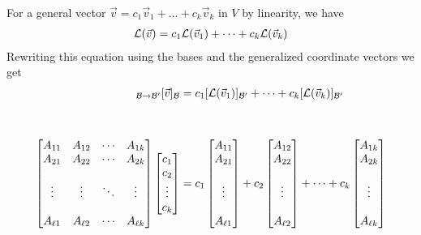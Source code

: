 For a general vector $\vec{v} = c_1 \vec{v}_1 + \dots + c_k \vec{v}_k$ in $V$ by linearity, we have\\
\begin{align*}
  \mathcal{L} (\vec{v}) = c_1 \mathcal{L} (\vec{v}_1) + \dots + c_k \mathcal{L} (\vec{v}_k)\\
\end{align*}
Rewriting this equation using the bases and the generalized coordinate vectors we get\\
\begin{align*}
  [\call]_{\calb \rightarrow \calb'} [\vec{v}]_{\calb}
  &= c_1 [\call (\vec{v}_1)]_{\calb'} + \dots + c_k [\call (\vec{v}_k)]_{\calb'} \\\\\\
  \begin{bmatrix}
    A_{11} & A_{12} & \cdots & A_{1k} \\
    A_{21} & A_{22} & \cdots & A_{2k} \\\\
    \vdots & \vdots & \ddots & \vdots \\\\
    A_{\ell 1} & A_{\ell 2} & \cdots & A_{\ell k}
  \end{bmatrix}
  \begin{bmatrix} c_1 \\ c_2 \\ \vdots \\ c_k \end{bmatrix}
    &=
    c_1 \begin{bmatrix}
      A_{11} \\
      A_{21} \\\\
      \vdots \\\\
      A_{\ell 1}
    \end{bmatrix}
    + c_2 \begin{bmatrix}
      A_{12} \\
      A_{22} \\\\
      \vdots \\\\
      A_{\ell 2}
    \end{bmatrix}
    + \dots +
    c_k \begin{bmatrix}
      A_{1k} \\
      A_{2k} \\\\
      \vdots \\\\
      A_{\ell k}
    \end{bmatrix}
    \\
\end{align*}

